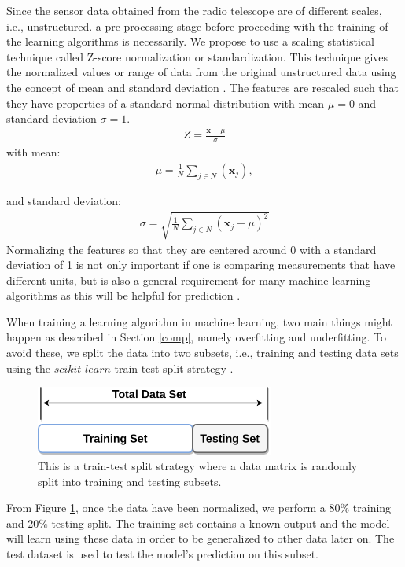Since the sensor data obtained from the radio telescope are of different scales, i.e., unstructured. a pre-processing stage before proceeding with the training of the learning algorithms is necessarily. We propose to use a scaling statistical technique called Z-score normalization or standardization. This technique gives the normalized values or range of data from the original unstructured data using the concept of mean and standard deviation \citep{patro2015normalization}. The features are rescaled such that they have properties of a standard normal distribution with mean $\mu=0$ and standard deviation $\sigma=1$. 
\begin{align}
Z=\frac{\textbf{x}- \mu}{\sigma}
\end{align}
with mean:
\begin{align*}
\mu= \frac{1}{N} \sum_{j\in N} (\textbf{x}_j),
\end{align*}

and standard deviation:
\begin{align*}
\sigma=\sqrt{ \frac{1}{N} \sum_{j\in N} (\textbf{x}_j-\mu )^2}
\end{align*}
Normalizing the features so that they are centered around 0 with a standard deviation of 1 is not only important if one is comparing measurements that have different units, but is also a general requirement for many machine learning algorithms as this will be helpful for prediction \citep{bott2014feature}.

When training a learning algorithm  in machine learning, two main things might happen as described in Section \ref{comp}, namely overfitting and underfitting. To avoid these, we split the data into two subsets, i.e., training and testing data sets using the $\textit{scikit-learn}$ train-test split strategy \citep{buitinck2013api}. 

  \begin{figure}[H]
  \centering
    \includegraphics[width=0.7\textwidth]{images/t_s.png}
    \caption{This is a train-test split strategy where a data matrix is randomly split into training and testing  subsets.}
  \label{ts}
\end{figure}

From Figure \ref{ts}, once the data have been normalized, we perform a 80$ \%$ training and 20$\%$ testing split. The training set contains a known output and the model will learn using these data in order to be generalized to other data later on. The test dataset is used to test the model's prediction on this subset.
 
